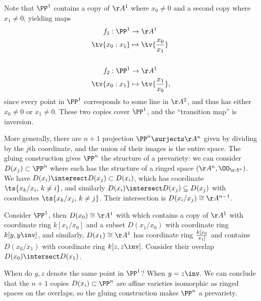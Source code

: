 \begin{example}[?]

Note that \(\PP^1\) contains a copy of \(\AA^1\) where \(x_0 \neq 0\)
and a second copy where \(x_1 \neq 0\), yielding maps
\begin{align*}  
f_1: \PP^1 &\to \AA^1 \\
\tv{x_0: x_1} &\mapsto \tv{{x_0 \over x_1}} \\ \\
f_2: \PP^1 &\to \AA^1 \\
\tv{x_0: x_1} &\mapsto \tv{{x_1 \over x_0}}
,\end{align*} since every point in \(\PP^1\) corresponds to some line in
\(\AA^2\), and thus has either \(x_0\neq 0\) or \(x_1 \neq 0\). These
two copies cover \(\PP^1\), and the ``transition map'' is inversion.

\end{example}

\begin{remark}

More generally, there are \(n+1\) projection \(\PP^n \surjects \AA^n\)
given by dividing by the \(j\)th coordinate, and the union of their
images is the entire space. The gluing construction gives \(\PP^n\) the
structure of a prevariety: we can consider \(D(x_j) \subset \PP^n\)
where each has the structure of a ringed space \((\AA^n, \OO_{\AA^n})\).
We have \(D(x_i) \intersect D(x_j) \subset D(x_i)\), which has
coordinate \(\ts{ x_k/x_i,\, k\neq i }\), and similarly
\(D(x_i) \intersect D(x_j) \subseteq D(x_j)\) with coordinates
\(\ts{ x_k/x_j, \, k\neq j}\). Their intersection is
\(D(x_i / x_j) \cong \AA^{n-1}\).

\end{remark}

\begin{example}[?]

Consider \(\PP^1\), then \(D(x_0) \cong \AA^1\) with which contains a
copy of \(\AA^1\) with coordinate ring \(k[x_1 / x_0]\) and a subset
\(D(x_1 / x_0)\) with coordinate ring \(k[y, y\inv]\), and similarly,
\(D(x_1) \cong \AA^1\) has coordinate ring \(k[x_0\over x_1]\) and
contains \(D(x_0/ x_1)\) with coordinate ring \(k[z, z\inv]\). Consider
their overlap \(D(x_0) \intersect D(x_1)\).

When do \(y, z\) denote the same point in \(\PP^1\)? When \(y = z\inv\).
We can conclude that the \(n+1\) copies \(D(x_i) \subset \PP^n\) are
affine varieties isomorphic as ringed spaces on the overlaps, so the
gluing construction makes \(\PP^n\) a prevariety.

\end{example}

